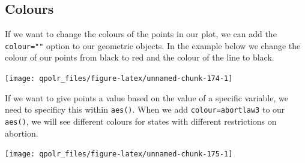 \documentclass[12pt,oneside]{reedthesis}
\theoremstyle{definition}
\theoremstyle{definition}
\theoremstyle{definition}
\theoremstyle{remark}
\begin{document}
  \subsection{Colours}\label{colours}
  
  If we want to change the colours of the points in our plot, we can add
  the \texttt{colour=""} option to our geometric objects. In the example
  below we change the colour of our points from black to red and the
  colour of the line to black.
  \begin{Shaded}
  \begin{Highlighting}[]
  \NormalTok{(}\OperatorTok{+}
  \StringTok{  }\NormalTok{(}\NormalTok{) }\OperatorTok{+}\StringTok{ }
  \StringTok{  }\NormalTok{(}\NormalTok{, }\NormalTok{) }\OperatorTok{+}
  \StringTok{  }\NormalTok{()}
  \end{Highlighting}
  \end{Shaded}
  \begin{center}\texttt{[image: qpolr\_files/figure-latex/unnamed-chunk-174-1]} \end{center}
  
  If we want to give points a value based on the value of a specific
  variable, we need to specificy this within \texttt{aes()}. When we add
  \texttt{colour=abortlaw3} to our \texttt{aes()}, we will see different
  colours for states with different restrictions on abortion.
  \begin{Shaded}
  \begin{Highlighting}[]
  \NormalTok{(}\OperatorTok{+}
  \StringTok{  }\NormalTok{(}\NormalTok{(}\OperatorTok{+}\StringTok{ }
  \StringTok{  }\NormalTok{(}\NormalTok{, }\NormalTok{) }\OperatorTok{+}
  \StringTok{  }\NormalTok{()}
  \end{Highlighting}
  \end{Shaded}
  \begin{center}\texttt{[image: qpolr\_files/figure-latex/unnamed-chunk-175-1]} \end{center}
  
\end{document}
